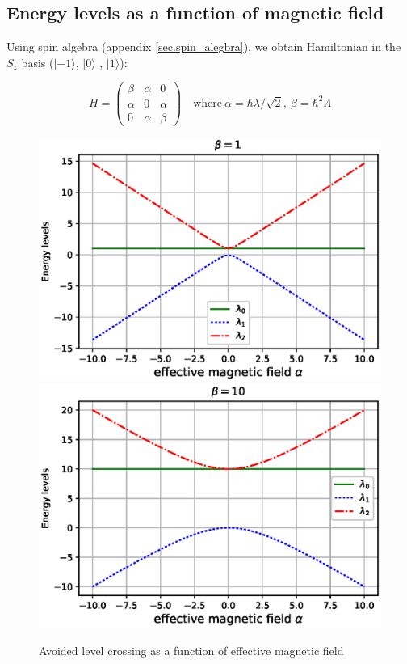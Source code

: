 \documentclass[11pt,a4paper]{article}
\begin{document}
\subsection{Energy levels as a function of magnetic field}

Using spin algebra  (appendix \ref{sec.spin_alegbra}), we obtain Hamiltonian in the $S_z$ basis ($|- 1\rangle$, $| 0 \rangle$ , $| 1 \rangle$):

\begin{equation}
H= \begin{pmatrix}
    \beta       & \alpha  & 0  \\
    \alpha       & 0 &\alpha  \\
     0       & \alpha & \beta
\end{pmatrix}
\quad \mbox{where}  ~
 \alpha= \hbar \lambda/ \sqrt{2}, ~ \beta= \hbar^2 \Lambda
\end{equation}


\begin{figure}[!ht]
\begin{center}
\includegraphics[scale=0.5]{pics/energy_level_beta1.eps} 
\includegraphics[scale=0.5]{pics/energy_level_beta10.eps} 
\caption{Avoided level crossing as a function of effective magnetic field }
\label{ev}
\end{center}
\end{figure}
\end{document}
